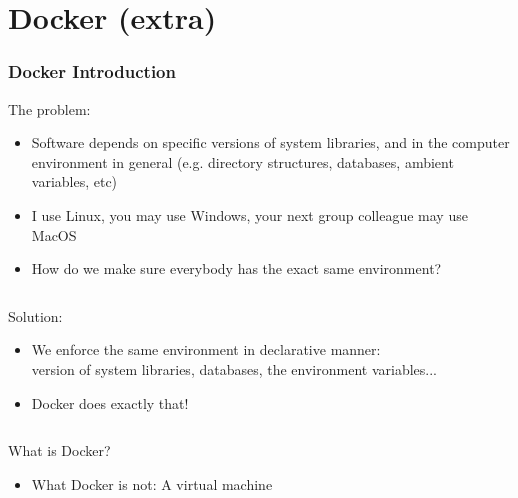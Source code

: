 \documentclass[fleqn,aspectratio=169,10pt]{beamer}
\begin{document}
\begin{frame}[fragile]
\begin{columns}
\begin{column}{.4\linewidth}
\begin{figure}[]
      \end{figure}
    \end{column}
  \end{columns}
\end{frame}

\section{Docker (extra)}
\begin{frame}
  \frametitle{Docker Introduction}
  \vspace*{-1.5ex}
  \pause
  \begin{block}{The problem:}
    \begin{itemize}
      \item Software depends on specific versions of system libraries, and in the computer environment in general (e.g. directory structures, databases, ambient variables, etc)
            \pause
      \item I use Linux, you may use Windows, your next group colleague may use MacOS
            \pause
      \item How do we make sure everybody has the exact same environment?
    \end{itemize}
    \pause
  \vspace*{-2ex}
    \begin{columns}
      \begin{column}{.95\textwidth}
        \begin{block}{Solution:}
          \begin{itemize}
            \item We enforce the same environment in declarative manner: \\ version of system libraries, databases, the environment variables...
            \item Docker does exactly that!
          \end{itemize}
        \end{block}
      \end{column}
    \end{columns}
  \end{block}
  \vspace*{-1.8ex}
  \pause
  \begin{columns}
    \begin{column}{.45\textwidth}
  \begin{block}{What is Docker?}
    \begin{itemize}
            \pause
      \item What Docker is not: A virtual machine

\end{itemize}
\end{block}
\end{column}
\end{columns}
\end{frame}
\end{document}
